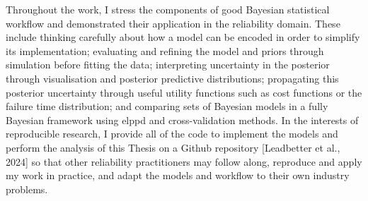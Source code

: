 Throughout the work, I stress the components of good Bayesian statistical workflow and demonstrated their application in the reliability domain. These include thinking carefully about how a model can be encoded in order to simplify its implementation; evaluating and refining the model and priors through simulation before fitting the data; interpreting uncertainty in the posterior through visualisation and posterior predictive distributions; propagating this posterior uncertainty through useful utility functions such as cost functions or the failure time distribution; and comparing sets of Bayesian models in a fully Bayesian framework using elppd and cross-validation methods. In the interests of reproducible research, I provide all of the code to implement the models and perform the analysis of this Thesis on a Github repository [Leadbetter et al., 2024] so that other reliability practitioners may follow along, reproduce and apply my work in practice, and adapt the models and workflow to their own industry problems.

